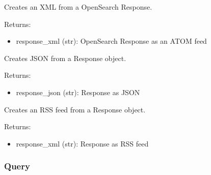 \documentclass[letterpaper,10pt,english]{sphinxmanual}
\begin{document}
\begin{fulllineitems}

\begin{fulllineitems}
\label{api2.0:puppy.model.Response.to_atom}
Creates an XML from a OpenSearch Response.

Returns:
\begin{itemize}
\item {} 
response\_xml (str): OpenSearch Response as an ATOM feed

\end{itemize}

\end{fulllineitems}


\begin{fulllineitems}
\label{api2.0:puppy.model.Response.to_json}
Creates JSON from a Response object.

Returns:
\begin{itemize}
\item {} 
response\_json (str): Response as JSON

\end{itemize}

\end{fulllineitems}


\begin{fulllineitems}
\label{api2.0:puppy.model.Response.to_rss}
Creates an RSS feed from a Response object.

Returns:
\begin{itemize}
\item {} 
response\_xml (str): Response as RSS feed

\end{itemize}

\end{fulllineitems}


\end{fulllineitems}



\subsubsection{Query}
\label{api2.0:query}\label{api2.0:puppy-query}
\end{document}
